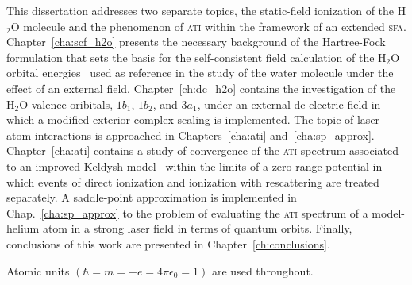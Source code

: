 This dissertation addresses two separate topics, the static-field
ionization of the H$_{2}$O molecule and the phenomenon of \textsc{ati}
within the framework of an extended
\textsc{sfa}. Chapter~\ref{cha:scf_h2o} presents the necessary
background of the Hartree-Fock formulation that sets the basis for the
self-consistent field calculation of the H$_{2}$O orbital
energies~\cite{Moccia_1964} used as reference in the study of the
water molecule under the effect of an external
field. Chapter~\ref{ch:dc_h2o} contains the investigation of the
H$_{2}$O valence oribitals, $1b_{1}$, $1b_{2}$, and $3a_{1}$, under an
external dc electric field in which a modified exterior complex
scaling is implemented. The topic of laser-atom interactions is
approached in Chapters~\ref{cha:ati}
and~\ref{cha:sp_approx}. Chapter~\ref{cha:ati} contains a study of
convergence of the \textsc{ati} spectrum associated to an improved
Keldysh model~\cite{Kopold_1997sfa} within the limits of a zero-range
potential in which events of direct ionization and ionization with
rescattering are treated separately. A saddle-point approximation is
implemented in Chap.~\ref{cha:sp_approx} to the problem of evaluating
the \textsc{ati} spectrum of a model-helium atom in a strong laser
field in terms of quantum orbits. Finally, conclusions of this work
are presented in Chapter~\ref{ch:conclusions}.

Atomic units $(\hbar = m = -e = 4\pi\epsilon_{0} = 1)$ are used
throughout.
































